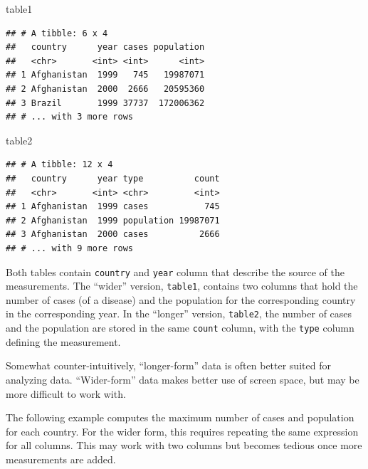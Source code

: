 \documentclass[]{book}
\newenvironment{Shaded}{}{}
\newcommand{\DataTypeTok}[1]{#1}
\newcommand{\KeywordTok}[1]{\textcolor[rgb]{0.00,0.00,1.00}{#1}}
\newcommand{\NormalTok}[1]{#1}
\newcommand{\OperatorTok}[1]{#1}
\newcommand{\StringTok}[1]{\textcolor[rgb]{0.00,0.50,0.50}{#1}}
\begin{document}
\begin{Shaded}
\begin{Highlighting}[]
\NormalTok{table1}
\end{Highlighting}
\end{Shaded}

\begin{verbatim}
## # A tibble: 6 x 4
##   country      year cases population
##   <chr>       <int> <int>      <int>
## 1 Afghanistan  1999   745   19987071
## 2 Afghanistan  2000  2666   20595360
## 3 Brazil       1999 37737  172006362
## # ... with 3 more rows
\end{verbatim}

\begin{Shaded}
\begin{Highlighting}[]
\NormalTok{table2}
\end{Highlighting}
\end{Shaded}

\begin{verbatim}
## # A tibble: 12 x 4
##   country      year type          count
##   <chr>       <int> <chr>         <int>
## 1 Afghanistan  1999 cases           745
## 2 Afghanistan  1999 population 19987071
## 3 Afghanistan  2000 cases          2666
## # ... with 9 more rows
\end{verbatim}

Both tables contain \texttt{country} and \texttt{year} column that describe the source of the measurements.
The ``wider'' version, \texttt{table1}, contains two columns that hold the number of cases (of a disease) and the population for the corresponding country in the corresponding year.
In the ``longer'' version, \texttt{table2}, the number of cases and the population are stored in the same \texttt{count} column, with the \texttt{type} column defining the measurement.

Somewhat counter-intuitively, ``longer-form'' data is often better suited for analyzing data.
``Wider-form'' data makes better use of screen space, but may be more difficult to work with.

The following example computes the maximum number of cases and population for each country.
For the wider form, this requires repeating the same expression for all columns.
This may work with two columns but becomes tedious once more measurements are added.

\begin{Shaded}
\end{Shaded}
\end{document}
